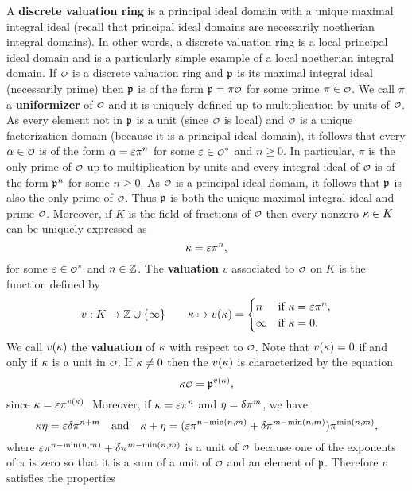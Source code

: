     A \textbf{discrete valuation ring} is a principal ideal domain with a unique maximal integral ideal (recall that principal ideal domains are necessarily noetherian integral domains). In other words, a discrete valuation ring is a local principal ideal domain and is a particularly simple example of a local noetherian integral domain. If $\smc{O}$ is a discrete valuation ring and $\mathfrak{p}$ is its maximal integral ideal (necessarily prime) then $\mathfrak{p}$ is of the form $\mf{p} = \pi\smc{O}$ for some prime $\pi \in \smc{O}$. We call $\pi$ a \textbf{uniformizer} of $\smc{O}$ and it is uniquely defined up to multiplication by units of $\smc{O}$. As every element not in $\mathfrak{p}$ is a unit (since $\smc{O}$ is local) and $\smc{O}$ is a unique factorization domain (because it is a principal ideal domain), it follows that every $\a \in \smc{O}$ is of the form $\alpha = \varepsilon\pi^{n}$ for some $\e \in \smc{O}^{\ast}$ and $n \ge 0$. In particular, $\pi$ is the only prime of $\smc{O}$ up to multiplication by units and every integral ideal of $\smc{O}$ is of the form $\mathfrak{p}^{n}$ for some $n \ge 0$. As $\smc{O}$ is a principal ideal domain, it follows that $\mathfrak{p}$ is also the only prime of $\smc{O}$. Thus $\mathfrak{p}$ is both the unique maximal integral ideal and prime $\smc{O}$. Moreover, if $K$ is the field of fractions of $\smc{O}$ then every nonzero $\kappa \in K$ can be uniquely expressed as
    \[
      \kappa = \varepsilon\pi^{n},
    \]
    for some $\e \in \smc{O}^{\ast}$ and $n \in \mathbb{Z}$. The \textbf{valuation} $v$ associated to $\smc{O}$ on $K$ is the function defined by
    \[
      v:K \to \mathbb{Z} \cup \{\infty\} \qquad \kappa \mapsto v(\kappa) = \begin{cases} n & \text{if $\kappa = \varepsilon\pi^{n}$}, \\ \infty & \text{if $\kappa = 0$}. \end{cases}
    \]
    We call $v(\kappa)$ the \textbf{valuation} of $\kappa$ with respect to $\smc{O}$. Note that $v(\kappa) = 0$ if and only if $\kappa$ is a unit in $\smc{O}$. If $\kappa \neq 0$ then the $v(\kappa)$ is characterized by the equation
    \begin{equation}\label{equ:valuation_characterization}
      \k\smc{O} = \mf{p}^{v(\k)},
    \end{equation}
    since $\kappa = \varepsilon\pi^{v(\kappa)}$. Moreover, if $\kappa = \varepsilon\pi^{n}$ and $\eta = \delta\pi^{m}$, we have
    \[
      \kappa\eta = \varepsilon\delta\pi^{n+m} \quad \text{and} \quad \kappa+\eta = (\varepsilon\pi^{n-\min(n,m)}+\delta\pi^{m-\min(n,m)})\pi^{\min(n,m)},
    \]
    where $\varepsilon\pi^{n-\min(n,m)}+\delta\pi^{m-\min(n,m)}$ is a unit of $\smc{O}$ because one of the exponents of $\pi$ is zero so that it is a sum of a unit of $\smc{O}$ and an element of $\mathfrak{p}$. Therefore $v$ satisfies the properties
